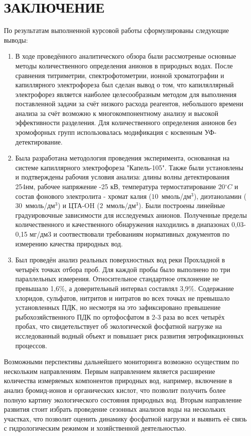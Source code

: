 \chapter*{ЗАКЛЮЧЕНИЕ}

По результатам выполненной курсовой работы сформулированы следующие выводы:

\begin{enumerate}
  \item В ходе проведённого аналитического обзора были рассмотреные основные методы количественного определения анионов в природных водах. После сравнения титриметрии, спектрофотометрии, ионной хроматографии и капиллярного электрофореза был сделан вывод о том, что капиляллярный электрофорез является наиболее целесообразным методом для выполнения поставленной задачи за счёт низкого расхода реагентов, небольшого времени анализа за счёт возможно к многокомпонентному анализу и высокой эффективности разделения. Для количественного определения анионов без хромофорных групп использовалась модификация с косвенным УФ-детектирование.

  \item Была разработана методология проведения эксперимента, основанная на системе капиллярного электрофореза "Капель-105". Также были установлены и подтверждены рабочия условия анализа: длины волны детектирования 254нм, рабочее напряжение -25 кВ, температура термостатирование 20$^\circ C$ и состав фонового электролита - хромат калия ($10$~ммоль/дм$^3$), диэтаноламин ($30$~ммоль/дм$^3$) и ЦТА-OH ($2$~ммоль/дм$^3$). Были построены линейные градуировочные зависимости для исследуемых анионов. Полученные пределы количественного и качественного обнаружения находились в диапазонах 0,03-0,15 мг/дм3 и соотвествовали требованиям нормативных документов по измерению качества природных вод.

  \item Был проведён анализ реальных поверхностных вод реки Прохладной в четырёх точках отбора проб. Для каждой пробы было выполнено по три параллельных измерения. Относительное стандартное отклонение не превышало 1,6\%, а доверительный интервал составлял 3,9\%. Содержание хлоридов, сульфатов, нитритов и нитратов во всех точках не превышало установленных ПДК, но несмотря на это зафиксировано превышение рыбохозяйственного ПДК по ортофосфатом в 2-3 раза во всех четырёх пробах, что свидетельствует об экологической фосфатной нагрузке на исследованный водный объект и повышает риск развития эвтрофикационных процессов.
\end{enumerate}

Возможными перспективы дальнейшего мониторинга возможно осуществим по нескольким направлениям. Первым направлением является расширение количества измеряемых компонентов природных вод, например, включение в анализ бромид-ионов и органических кислот, что позволит получить более полную картину экологического состояния природных вод. Вторым направление развития стоит избрать проведение сезонных анализов воды на нескольких участках, что позволит оценить динамику фосфатной нагрузки и выявить её связь с гидрологическим режимом и хозяйственной деятельностью.
